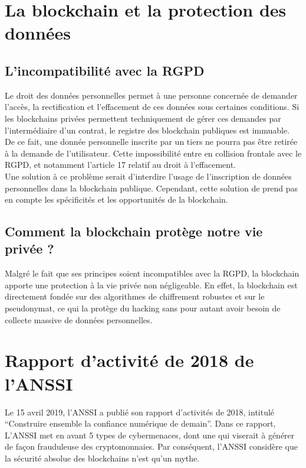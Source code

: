 \documentclass[12pt, a4paper, oneside]{book}
\begin{document}
    \section{La blockchain et la protection des données}
    \subsection{L'incompatibilité avec la RGPD}
    Le droit des données personnelles permet 
    à une personne concernée de demander l’accès, la rectification 
    et l’effacement de ces données sous certaines conditions. 
    Si les blockchains privées permettent techniquement de gérer
    ces demandes par l’intermédiaire d’un contrat,
    le registre des blockchain publiques est immuable. De ce fait,
    une donnée personnelle inscrite par un tiers ne pourra pas être retirée 
    à la demande de l’utilisateur. Cette impossibilité entre en collision frontale avec le RGPD, 
    et notamment l’article 17 relatif au droit à l’effacement. 
    \\ 
    \newline
    Une solution à ce problème serait d'interdire l'usage de l'inscription de données personnelles dans la blockchain publique. 
    Cependant, cette solution de prend pas en compte les spécificités et les opportunités de la blockchain.
    \cite{reg}

    \subsection{Comment la blockchain protège notre vie privée ?}

    Malgré le fait que ses principes 
     soient incompatibles avec la RGPD, la blockchain apporte une protection à la vie privée non négligeable. 
     En effet, la blockchain est directement fondée sur des algorithmes de chiffrement robustes et sur le pseudonymat,
     ce qui la protège du hacking sans pour autant avoir besoin de collecte massive de données personnelles.
     \cite{reg}

    \section{Rapport d'activité de 2018 de l'ANSSI}

    Le 15 avril 2019, l'ANSSI a publié son rapport d'activités de 2018, intitulé \hyphenquote{french}{Construire ensemble la confiance 
    numérique de demain}. 
    Dans ce rapport, L'ANSSI met en avant 5 types de cybermenaces, dont une qui viserait à générer de façon frauduleuse des 
    cryptomonnaies. Par conséquent, l'ANSSI considère que la sécurité absolue des blockchains n'est qu'un mythe.
    \cite{anssi2018}
\end{document}
